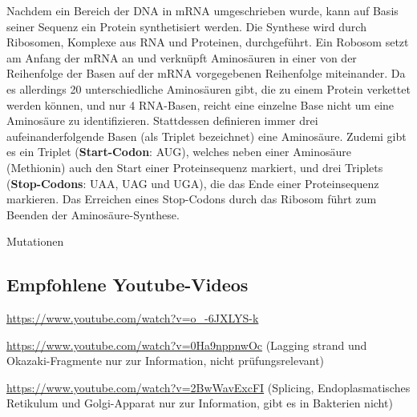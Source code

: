 Nachdem ein Bereich der DNA in mRNA umgeschrieben wurde, kann auf Basis seiner Sequenz ein Protein synthetisiert werden. Die Synthese wird durch Ribosomen, Komplexe aus RNA und Proteinen, durchgeführt. Ein Robosom setzt am Anfang der mRNA an und verknüpft Aminosäuren in einer von der Reihenfolge der Basen auf der mRNA vorgegebenen Reihenfolge miteinander. Da es allerdings 20 unterschiedliche Aminosäuren gibt, die zu einem Protein verkettet werden können, und nur 4 RNA-Basen, reicht eine einzelne Base nicht um eine Aminosäure zu identifizieren. Stattdessen definieren immer drei aufeinanderfolgende Basen (als Triplet bezeichnet) eine Aminosäure. Zudemi gibt es ein Triplet (\textbf{Start-Codon}: AUG), welches neben einer Aminosäure (Methionin) auch den Start einer Proteinsequenz markiert, und drei Triplets (\textbf{Stop-Codons}: UAA, UAG und UGA), die das Ende einer Proteinsequenz markieren. Das Erreichen eines Stop-Codons durch das Ribosom führt zum Beenden der Aminosäure-Synthese. 

Mutationen

\subsection{Empfohlene Youtube-Videos}
\begin{description}[align=left]
	\item [DNA-Struktur] \href{https://www.youtube.com/watch?v=o\_-6JXLYS-k}{https://www.youtube.com/watch?v=o\_-6JXLYS-k}
	\item [DNA-Replikation] \href{https://www.youtube.com/watch?v=0Ha9nppnwOc}{https://www.youtube.com/watch?v=0Ha9nppnwOc} (Lagging strand und Okazaki-Fragmente nur zur Information, nicht prüfungsrelevant)
	\item [Transkription und Translation] \href{https://www.youtube.com/watch?v=2BwWavExcFI}{https://www.youtube.com/watch?v=2BwWavExcFI} (Splicing, Endoplasmatisches Retikulum und Golgi-Apparat nur zur Information, gibt es in Bakterien nicht)
\end{description}
  
